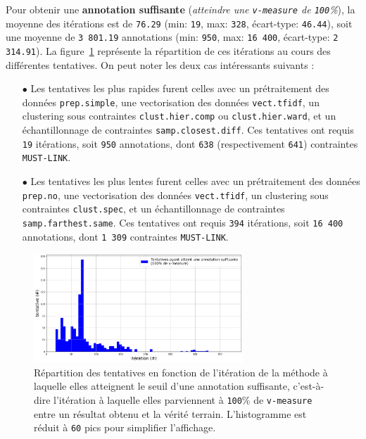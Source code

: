			Pour obtenir une \textbf{annotation suffisante} (\textit{atteindre une \texttt{v-measure} de \texttt{100}\%}), la moyenne des itérations est de \texttt{76.29} (min: \texttt{19}, max: \texttt{328}, écart-type: \texttt{46.44}), soit une moyenne de \texttt{3 801.19} annotations (min: \texttt{950}, max: \texttt{16 400}, écart-type: \texttt{2 314.91}).
			La figure~\ref{figure:4.2.1-ETUDE-OPTIMISATION-HISTOGRAMME-ANNOTATION-SUFFISANTE} représente la répartition de ces itérations au cours des différentes tentatives.
			On peut noter les deux cas intéressants suivants :
			\begin{itemize}
				\item[\(\bullet\)] Les tentatives les plus rapides furent celles avec un prétraitement des données \texttt{prep.simple}, une vectorisation des données \texttt{vect.tfidf}, un clustering sous contraintes \texttt{clust.hier.comp} ou \texttt{clust.hier.ward}, et un échantillonnage de contraintes \texttt{samp.closest.diff}. Ces tentatives ont requis \texttt{19} itérations, soit \texttt{950} annotations, dont \texttt{638} (respectivement \texttt{641}) contraintes \texttt{MUST-LINK}.
				\item[\(\bullet\)] Les tentatives les plus lentes furent celles avec un prétraitement des données \texttt{prep.no}, une vectorisation des données \texttt{vect.tfidf}, un clustering sous contraintes \texttt{clust.spec}, et un échantillonnage de contraintes \texttt{samp.farthest.same}. Ces tentatives ont requis \texttt{394} itérations, soit \texttt{16 400} annotations, dont \texttt{1 309} contraintes \texttt{MUST-LINK}.
			\end{itemize}
			\begin{figure}[!htb]
				\centering
				\includegraphics[width=0.7\textwidth]{figures/etude-efficience-histogramme-annotation-suffisante}
				\caption{Répartition des tentatives en fonction de l'itération de la méthode à laquelle elles atteignent le seuil d'une annotation suffisante, c'est-à-dire l'itération à laquelle elles parviennent à \texttt{100}\% de \texttt{v-measure} entre un résultat obtenu et la vérité terrain. L'histogramme est réduit à \texttt{60} pics pour simplifier l'affichage.}
				\label{figure:4.2.1-ETUDE-OPTIMISATION-HISTOGRAMME-ANNOTATION-SUFFISANTE}
			\end{figure}
